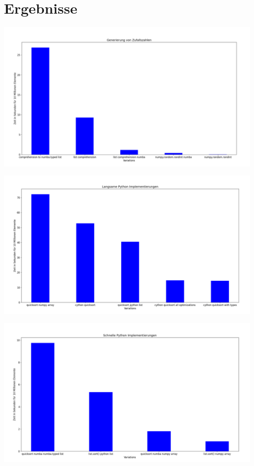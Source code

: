 \documentclass[12pt,a4paper]{article}
\begin{document}
\clearpage
\section{Ergebnisse}

\begin{center}
    \hspace*{-3cm}\includegraphics[width=1.4\textwidth]{./diagramme/matplotlib/zufallszahlen.png}
\end{center}

\begin{center}
    \hspace*{-3cm}\includegraphics[width=1.4\textwidth]{./diagramme/matplotlib/pythonlangsam.png}
\end{center}

\begin{center}
    \hspace*{-3cm}\includegraphics[width=1.4\textwidth]{./diagramme/matplotlib/pythonschnell.png}
\end{center}
\end{document}
